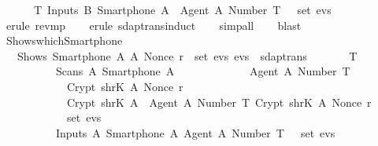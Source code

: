 \begin{isabellebody}
  \ \ \ \ {\isasymLongrightarrow}\ {\isacharparenleft}{\isasymexists}\ T{\isachardot}\ Inputs\ B\ {\isacharparenleft}Smartphone\ A{\isacharparenright}\ {\isasymlbrace}\ Agent\ A{\isacharcomma}\ Number\ T\ {\isasymrbrace}\ {\isasymin}\ set\ evs{\isacharparenright}{\isachardoublequoteclose}\isanewline
  \isadelimproof
  \ \ %
  \endisadelimproof
  \isatagproof
  \isamarkupfalse%
  \ {\isacharparenleft}erule\ rev{\isacharunderscore}mp{\isacharparenright}\isanewline
  \ \ \isamarkupfalse%
  \ {\isacharparenleft}erule\ sdaptrans{\isachardot}induct{\isacharparenright}\isanewline
  \ \ \isamarkupfalse%
  \ {\isacharparenleft}simp{\isacharunderscore}all{\isacharparenright}\isanewline
  \ \ \isamarkupfalse%
  \ {\isacharparenleft}blast{\isacharplus}{\isacharparenright}\isanewline
  \isamarkupfalse%
  \endisatagproof
  {\isafoldproof}%
  \isadelimproof
  \isanewline
  \endisadelimproof
  \isanewline
  \isamarkupfalse%
  \ Shows{\isacharunderscore}which{\isacharunderscore}Smartphone{\isacharunderscore}{}\ {\isacharcolon}\isanewline
  \ \ {\isachardoublequoteopen}{\isasymlbrakk}\ Shows\ {\isacharparenleft}Smartphone\ A{\isacharparenright}\ A\ {\isacharparenleft}Nonce\ r{\isacharparenright}\ {\isasymin}\ set\ evs{\isacharsemicolon}\ evs\ {\isasymin}\ sdaptrans\ {\isasymrbrakk}\isanewline
  \ \ \ \ {\isasymLongrightarrow}\ {\isacharparenleft}{\isasymexists}\ T{\isachardot}\isanewline
  \ \ \ \ \ \ \ \ \ \ Scans\ A\ {\isacharparenleft}Smartphone\ A{\isacharparenright}\ {\isasymlbrace}\isanewline
  \ \ \ \ \ \ \ \ \ \ \ \ {\isasymlbrace}Agent\ A{\isacharcomma}\ Number\ T{\isasymrbrace}{\isacharcomma}\isanewline
  \ \ \ \ \ \ \ \ \ \ \ \ Crypt\ {\isacharparenleft}shrK\ A{\isacharparenright}\ {\isacharparenleft}Nonce\ r{\isacharparenright}{\isacharcomma}\isanewline
  \ \ \ \ \ \ \ \ \ \ \ \ Crypt\ {\isacharparenleft}shrK\ A{\isacharparenright}\ {\isasymlbrace}\ {\isasymlbrace}Agent\ A{\isacharcomma}\ Number\ T{\isasymrbrace}{\isacharcomma}\ Crypt\ {\isacharparenleft}shrK\ A{\isacharparenright}\ {\isacharparenleft}Nonce\ r{\isacharparenright}\ {\isasymrbrace}\isanewline
  \ \ \ \ \ \ \ \ \ \ {\isasymrbrace}\ {\isasymin}\ set\ evs\ {\isasymand}\isanewline
  \ \ \ \ \ \ \ \ \ \ Inputs\ A\ {\isacharparenleft}Smartphone\ A{\isacharparenright}\ {\isasymlbrace}Agent\ A{\isacharcomma}\ Number\ T\ {\isasymrbrace}\ {\isasymin}\ set\ evs{\isacharparenright}{\isachardoublequoteclose}\isanewline
  \isadelimproof
  \isanewline
  \ \ %
  \endisadelimproof

\end{isabellebody}
